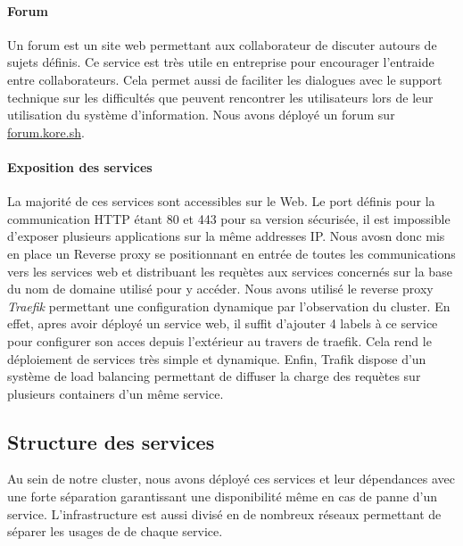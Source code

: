 \paragraph{Forum} Un forum est un site web permettant aux collaborateur de discuter autours de sujets définis.
Ce service est très utile en entreprise pour encourager l'entraide entre collaborateurs.
Cela permet aussi de faciliter les dialogues avec le support technique sur les difficultés que peuvent rencontrer les utilisateurs lors de leur utilisation du système d'information.
Nous avons déployé un forum sur \url{forum.kore.sh}.

\paragraph{Exposition des services} La majorité de ces services sont accessibles sur le Web.
Le port définis pour la communication HTTP étant 80 et 443 pour sa version sécurisée, il est impossible d'exposer plusieurs applications sur la même addresses IP.
Nous avosn donc mis en place un Reverse proxy se positionnant en entrée de toutes les communications vers les services web et distribuant les requètes aux services concernés sur la base du nom de domaine utilisé pour y accéder.
Nous avons utilisé le reverse proxy \emph{Traefik} permettant une configuration dynamique par l'observation du cluster.
En effet, apres avoir déployé un service web, il suffit d'ajouter 4 labels à ce service pour configurer son acces depuis l'extérieur au travers de traefik.
Cela rend le déploiement de services très simple et dynamique.
Enfin, Trafik dispose d'un système de load balancing permettant de diffuser la charge des requètes sur plusieurs containers d'un même service.

\subsection{Structure des services}

Au sein de notre cluster, nous avons déployé ces services et leur dépendances avec une forte séparation garantissant une disponibilité même en cas de panne d'un service.
L'infrastructure est aussi divisé en de nombreux réseaux permettant de séparer les usages de de chaque service.
